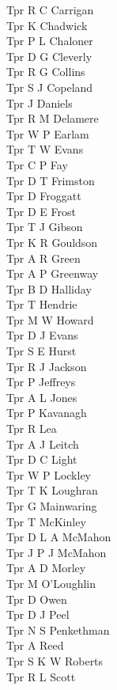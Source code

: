 \begin{multicols}{2}
  Tpr R C Carrigan \\
  Tpr K Chadwick \\
  Tpr P L Chaloner \\
  Tpr D G Cleverly \\
  Tpr R G Collins \\
  Tpr S J Copeland \\
  Tpr J Daniels \\
  Tpr R M Delamere \\
  Tpr W P Earlam \\
  Tpr T W Evans \\
  Tpr C P Fay \\
  Tpr D T Frimston \\
  Tpr D Froggatt \\
  Tpr D E Frost \\
  Tpr T J Gibson \\
  Tpr K R Gouldson \\
  Tpr A R Green \\
  Tpr A P Greenway \\
  Tpr B D Halliday \\
  Tpr T Hendrie \\
  Tpr M W Howard \\
  Tpr D J Evans \\
  Tpr S E Hurst \\
  Tpr R J Jackson \\
  Tpr P Jeffreys \\
  Tpr A L Jones \\
  Tpr P Kavanagh \\
  Tpr R Lea \\
  Tpr A J Leitch \\
  Tpr D C Light \\
  Tpr W P Lockley \\
  Tpr T K Loughran \\
  Tpr G Mainwaring \\
  Tpr T McKinley \\
  Tpr D L A McMahon \\
  Tpr J P J McMahon \\
  Tpr A D Morley \\
  Tpr M O'Loughlin \\
  Tpr D Owen \\
  Tpr D J Peel \\
  Tpr N S Penkethman \\
  Tpr A Reed \\
  Tpr S K W Roberts \\
  Tpr R L Scott \\

\end{multicols}
